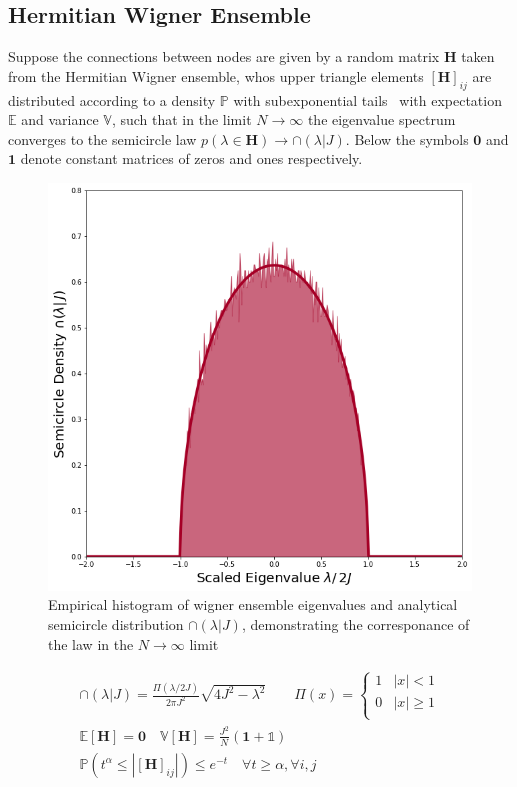 \documentclass{article}[12pt]
\numberwithin{equation}{section}
\begin{document}
\subsection{Hermitian Wigner Ensemble}
Suppose the connections between nodes are given by a random matrix
$\mathbf{H}$ taken from the Hermitian Wigner ensemble, whos upper triangle elements
$[\mathbf{H}]_{ij}$ are distributed according to a density $\mathbb{P}$ with
subexponential tails~\cite{} with expectation $\mathbb{E}$ and variance
$\mathbb{V}$, such that in the limit $N\rightarrow\infty$ the eigenvalue
spectrum converges to the semicircle law $p(\lambda\in\mathbf{H})\rightarrow\cap(\lambda|J)$.
Below the symbols $\mathbf{0}$ and $\mathbf{1}$ denote constant matrices of zeros and ones
respectively.
\begin{figure}[H]
\centering{}
\captionsetup{justification=centering}
\includegraphics[scale=0.4]{figures/semicircle}
\caption{Empirical histogram of wigner ensemble eigenvalues and analytical semicircle
distribution $\cap(\lambda|J)$, demonstrating the corresponance of the law in the
$N\rightarrow\infty$ limit}
\label{fig:semicircle}
\end{figure}
\vspace{-45pt}
\begin{align}
\cap(\lambda|J)=\frac{\Pi(\lambda/2J)}{2\pi J^2}\sqrt{4J^2-\lambda^2}\label{eq:semicircle}
\quad\quad
    \Pi(x)=
      \begin{cases}
        1 & |x|<1\\
        0 & |x|\geq1\\
      \end{cases}\\
\mathbb{E}[\mathbf{H}]=\mathbf{0}
\quad
\mathbb{V}[\mathbf{H}]=\frac{J^2}{N}(\mathbf{1}+\mathbb{1})
\quad\qquad\qquad\\
\mathbb{P}\left(
t^\alpha\leq
\left|[\mathbf{H}]_{ij}\right|
\right)\leq e^{-t}
\quad
\forall t\geq\alpha,\forall i,j
\quad\qquad\quad
\end{align}
\end{document}
